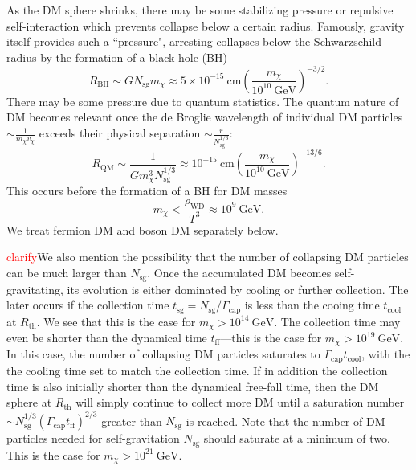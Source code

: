 \documentclass[preprintnumbers,amsmath,amssymb,prd,superscriptaddress]{revtex4}
\newcommand{\GeV}{\text{GeV}}
\newcommand{\cm}{\text{cm}}
\def\r{\right)}
\def\l{\left(}
\begin{document}
As the DM sphere shrinks, there may be some stabilizing pressure or repulsive self-interaction which prevents collapse below a certain radius.
Famously, gravity itself provides such a ``pressure", arresting collapses below the Schwarzschild radius by the formation of a black hole (BH) 
\begin{equation}
R_\text{BH} \sim G N_\text{sg} m_\chi \approx 5 \times 10^{-15} ~\cm \l \frac{m_\chi}{10^{10} ~\GeV} \r^{-3/2}.
\end{equation}
There may be some pressure due to quantum statistics.
The quantum nature of DM becomes relevant once the de Broglie wavelength of individual DM particles $\sim \frac{1}{m_\chi v_\chi}$ exceeds their physical separation $\sim \frac{r}{N_\text{sg}^{1/3}}$:
\begin{equation}
\label{eq:deg}
R_\text{QM} \sim \frac{1}{G m_\chi^3 N_\text{sg}^{1/3}} \approx 10^{-15} ~\cm \l\frac{m_\chi}{10^{10} ~\GeV}\r^{-13/6}.
\end{equation}
This occurs before the formation of a BH for DM masses
\begin{equation}
\label{eq:qm}
m_\chi < \frac{\rho_\text{WD}}{T^3} \approx 10^{9} ~\GeV.
\end{equation}
We treat fermion DM and boson DM separately below. 

\textcolor{red}{clarify}We also mention the possibility that the number of collapsing DM particles can be much larger than $N_\text{sg}$. 
Once the accumulated DM becomes self-gravitating, its evolution is either dominated by cooling or further collection. 
The later occurs if the collection time $t_\text{sg} = N_\text{sg}/\Gamma_\text{cap}$ is less than the cooing time $t_\text{cool}$ at $R_\text{th}$. 
We see that this is the case for $m_\chi > 10^{14} ~\GeV$. 
The collection time may even be shorter than the dynamical time $t_\text{ff}$---this is the case for $m_\chi > 10^{19} ~\GeV$. 
In this case, the number of collapsing DM particles saturates to $\Gamma_\text{cap} t_\text{cool}$, with the the cooling time set to match the collection time.  
If in addition the collection time is also initially shorter than the dynamical free-fall time, then the DM sphere at $R_\text{th}$ will simply continue to collect more DM until a saturation number $\sim N_\text{sg}^{1/3} (\Gamma_\text{cap} t_\text{ff})^{2/3}$ greater than $N_\text{sg}$ is reached. 
Note that the number of DM particles needed for self-gravitation $N_\text{sg}$ should saturate at a minimum of two. 
This is the case for $m_\chi > 10^{21} ~\GeV$. 
\end{document}
